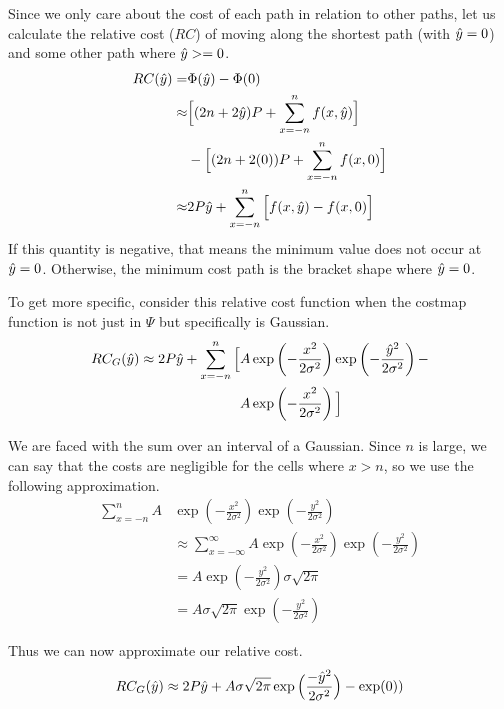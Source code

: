 Since we only care about the cost of each path in relation to other paths, let us calculate the relative cost ($RC$) of moving along the shortest path (with $\hat{y}=0$) and some other path where $\hat{y}>=0$. 
\begin{align*}
RC(\hat{y}) =& \Phi(\hat{y})-\Phi(0) \\
\approx& \Big[(2n+2\hat{y})P +  \sum\limits_{x=-n}^{n} f(x,\hat{y}) \Big] \\
 & - \Big[(2n+2(0))P +  \sum\limits_{x=-n}^{n} f(x,0) \Big] \\
\approx& 2P\hat{y} + \sum\limits_{x=-n}^{n} \Big[ f(x,\hat{y})-f(x,0) \Big]
\end{align*}
If this quantity is negative, that means the minimum value does not occur at $\hat{y}=0$. Otherwise, the minimum cost path is the bracket shape where $\hat{y}=0$.

To get more specific, consider this relative cost function when the costmap function is not just in $\Psi$ but specifically is Gaussian. 
\begin{align*}
RC_G(\hat{y}) \approx 2P\hat{y} + \sum\limits_{x=-n}^{n} \Big[ &A\exp\left(-\frac{x^2}{2\sigma^2}\right)\exp\left(-\frac{\hat{y}^2}{2\sigma^2}\right) -\\
                                                           &A\exp\left(-\frac{x^2}{2\sigma^2}\right) \Big] 
\end{align*}

We are faced with the sum over an interval of a Gaussian. Since $n$ is large, we can say that the costs are negligible for the cells where $x>n$, so we use the following approximation. 
\begin{align*}
        \sum\limits_{x=-n}^{n} A&\exp\left(-\frac{x^2}{2\sigma^2}\right)\exp\left(-\frac{y^2}{2\sigma^2}\right) \\
&\approx \sum\limits_{x=-\infty}^{\infty} A\exp\left(-\frac{x^2}{2\sigma^2}\right)\exp\left(-\frac{y^2}{2\sigma^2}\right)  \\
&= A\exp\left(-\frac{y^2}{2\sigma^2}\right)\sigma\sqrt{2\pi} \\
&= A\sigma\sqrt{2\pi}\exp\left(-\frac{y^2}{2\sigma^2}\right)
\end{align*}

Thus we can now approximate our relative cost. 
\[
RC_G(\hat{y}) \approx 2P\hat{y} + A\sigma\sqrt{2\pi} \exp\Big(\frac{-\hat{y}^2}{2\sigma^2}\Big) - \exp(0) ) \\
\]

